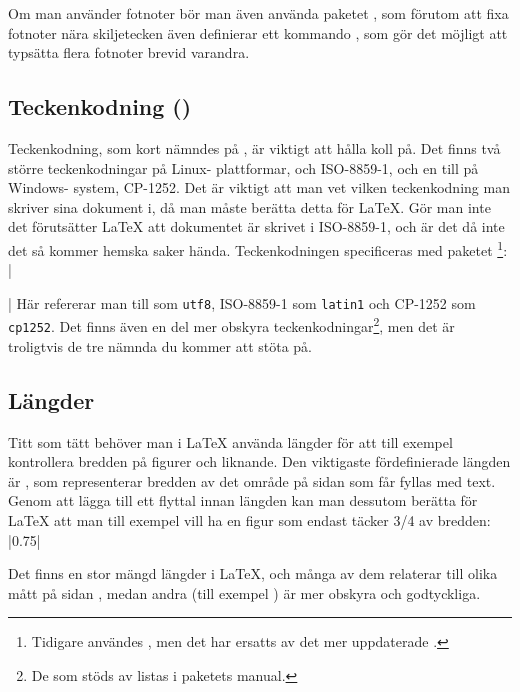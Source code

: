 \documentclass[10pt,../../a4.tex]{subfiles}
\begin{document}
Om man använder fotnoter bör man även använda paketet , som
förutom att fixa fotnoter nära skiljetecken även definierar ett kommando
, som gör det möjligt att typsätta flera fotnoter brevid
varandra.

\subsection{Teckenkodning (\UTF)}
Teckenkodning, som kort nämndes på , är
viktigt att hålla koll på. Det finns två större teckenkodningar på Linux-%
plattformar, \UTF{} och \textsc{ISO-8859-1}, och en till på Windows-%
system, \textsc{CP-1252}. Det är viktigt att man vet vilken teckenkodning
man skriver sina dokument i, då man måste berätta detta för \LaTeX. Gör
man inte det förutsätter \LaTeX{} att dokumentet är skrivet i
\textsc{ISO-8859-1}, och är det då inte det så kommer hemska saker hända.
Teckenkodningen specificeras med paketet %
\footnote{Tidigare användes , men det har ersatts av det
mer uppdaterade .%
\protect{}%
}:
\latex|\usepackage[<teckenkodning>]{inputenx}|
Här refererar man till \UTF{} som \texttt{utf8}, \textsc{ISO-8859-1} som
\texttt{latin1} och \textsc{CP-1252} som \texttt{cp1252}. Det finns även
en del mer obskyra teckenkodningar\footnote{De som stöds av 
 listas i paketets manual.}, men det är troligtvis de tre
nämnda du kommer att stöta på.

\subsection{Längder}
Titt som tätt behöver man i \LaTeX{} använda längder för att till exempel
kontrollera bredden på figurer och liknande. Den viktigaste fördefinierade
längden är , som representerar bredden av det område på
sidan som får fyllas med text. Genom att lägga till ett flyttal innan
längden kan man dessutom berätta för \LaTeX{} att man till exempel vill
ha en figur som endast täcker \num{3/4} av bredden:
\latex|0.75\textwidth|

Det finns en stor mängd längder i \LaTeX, och många av dem relaterar till
olika mått på sidan \parencite[132]{Oetiker11}, medan andra (till exempel
) är mer obskyra och godtyckliga.
\end{document}
